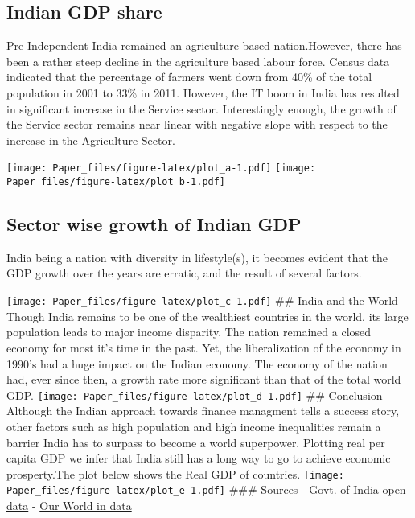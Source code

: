 \documentclass[]{article}
\begin{document}
\subsection{Indian GDP share}\label{indian-gdp-share}

Pre-Independent India remained an agriculture based nation.However,
there has been a rather steep decline in the agriculture based labour
force. Census data indicated that the percentage of farmers went down
from 40\% of the total population in 2001 to 33\% in 2011. However, the
IT boom in India has resulted in significant increase in the Service
sector. Interestingly enough, the growth of the Service sector remains
near linear with negative slope with respect to the increase in the
Agriculture Sector.

\texttt{[image: Paper\_files/figure-latex/plot\_a-1.pdf]}
\texttt{[image: Paper\_files/figure-latex/plot\_b-1.pdf]}

\subsection{Sector wise growth of Indian
GDP}\label{sector-wise-growth-of-indian-gdp}

India being a nation with diversity in lifestyle(s), it becomes evident
that the GDP growth over the years are erratic, and the result of
several factors.

\texttt{[image: Paper\_files/figure-latex/plot\_c-1.pdf]} \#\# India and
the World Though India remains to be one of the wealthiest countries in
the world, its large population leads to major income disparity. The
nation remained a closed economy for most it's time in the past. Yet,
the liberalization of the economy in 1990's had a huge impact on the
Indian economy. The economy of the nation had, ever since then, a growth
rate more significant than that of the total world GDP.
\texttt{[image: Paper\_files/figure-latex/plot\_d-1.pdf]} \#\# Conclusion
Although the Indian approach towards finance managment tells a success
story, other factors such as high population and high income
inequalities remain a barrier India has to surpass to become a world
superpower. Plotting real per capita GDP we infer that India still has a
long way to go to achieve economic prosperty.The plot below shows the
Real GDP of countries.
\texttt{[image: Paper\_files/figure-latex/plot\_e-1.pdf]} \#\#\# Sources -
\href{data.gov.in}{Govt. of India open data} -
\href{ourworldindata.org}{Our World in data}
\end{document}
